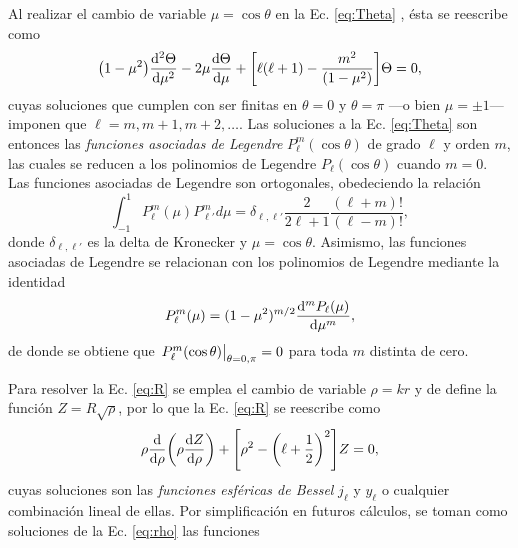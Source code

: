 Al realizar el cambio de variable $\mu = \cos\theta$ en la Ec. \eqref{eq:Theta} , ésta se reescribe como
	\begin{equation*}
	\qty(1-\mu^2) \dv[2]{\Theta}{\mu} - 2 \mu \dv{\Theta}{\mu} + \qty[\ell(\ell+1)-\frac{m^2}{(1-\mu^2)}]\Theta= 0,
	\end{equation*}
cuyas soluciones que cumplen con ser finitas en $\theta = 0$ y $\theta = \pi$ ---o bien $\mu=\pm1$--- imponen que $\ell = m, m+1,m+2,\ldots$. Las soluciones a la Ec. \eqref{eq:Theta} son entonces las \emph{funciones asociadas de Legendre} $P_\ell^m(\cos\theta)$ de grado $\ell$ y orden $m$, las cuales se reducen a los polinomios de Legendre $P_\ell(\cos\theta)$ cuando $m=0$. Las funciones asociadas de Legendre son ortogonales, obedeciendo la relación
	\begin{equation}
	\int_{-1}^1P_\ell^m(\mu) P_{\ell'}^md\mu = \delta_{\ell,\ell'}\frac{2}{2\ell+1}\frac{(\ell+m)!}{(\ell-m)!},
	\label{eq:ortLegendre}
	\end{equation}
donde $\delta_{\ell,\ell'}$ es la delta de Kronecker y $\mu=\cos\theta$. Asimismo, las funciones asociadas de Legendre se relacionan con los polinomios de Legendre mediante la identidad
	\begin{equation}
	P_\ell^m (\mu) = (1-\mu^2)^{m/2}\dv[m]{P_\ell(\mu)}{\mu},
	\label{eq:FAL-PL}
	\end{equation}
de donde se obtiene que $\eval{P_\ell^m(\cos\theta)}_{\theta=0,\pi}=0$ para toda $m$ distinta de cero. %

Para resolver la Ec. \eqref{eq:R} se emplea el cambio de variable $\rho = k r$ y de define la función $Z =R\sqrt{\rho}$, por lo que la Ec. \eqref{eq:R} se reescribe como
	\begin{equation}
	\rho \dv{\rho}\qty(\rho\dv{Z}{\rho})+\qty[\rho^2-\qty(\ell+\frac12)^2] Z = 0,
	\label{eq:rho}
	\end{equation}
cuyas soluciones son las \emph{funciones esféricas de Bessel} $j_\ell$ y $y_\ell$ o cualquier combinación lineal de ellas. Por simplificación en futuros cálculos, se toman como soluciones de la Ec. \eqref{eq:rho} las funciones

